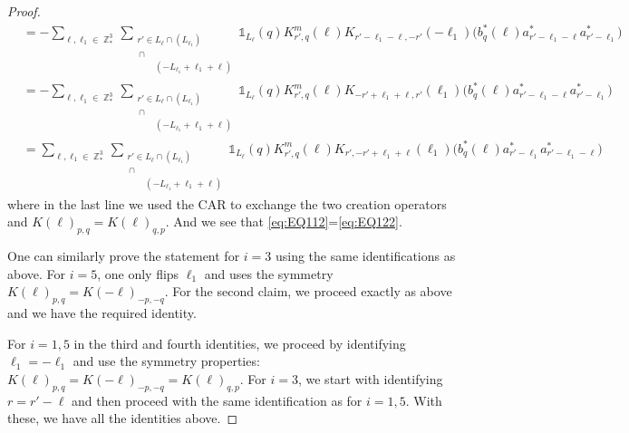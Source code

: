 \documentclass[sn-mathphys, Numbered ,a4paper]{sn-jnl}%
\DeclareMathOperator{\Z}{\mathbb{Z}}
\theoremstyle{plain}
\theoremstyle{definition}
\theoremstyle{remark}
\theoremstyle{plain}
\theoremstyle{definition}
\theoremstyle{remark}
\begin{document}
\begin{proof}
\begin{align}
		&=-\sum\limits_{\ell, \ell_1\in \Z^3_*}\sum\limits_{\substack{r' \in  L_{\ell} \cap (L_{\ell_1}) \\ \, \cap\\ \phantom{r'\in}  (-L_{\ell_1}+\ell_1+\ell)}} \!\!\!\! \mathds{1}_{L_\ell}(q) K^{m}_{r',q}(\ell) K_{r'-\ell_1-\ell,-r'}(-\ell_1)\Big( b^*_{q}(\ell) a^*_{r'-\ell_1-\ell}a^*_{r'-\ell_1}\Big)\nonumber\\
		&=-\sum\limits_{\ell, \ell_1\in \Z^3_*}\sum\limits_{\substack{r' \in  L_{\ell} \cap (L_{\ell_1}) \\ \, \cap\\ \phantom{r'\in}  (-L_{\ell_1}+\ell_1+\ell)}} \!\!\!\! \mathds{1}_{L_\ell}(q) K^{m}_{r',q}(\ell) K_{-r'+\ell_1+\ell,r'}(\ell_1)\Big( b^*_{q}(\ell) a^*_{r'-\ell_1-\ell}a^*_{r'-\ell_1}\Big)\nonumber\\
		&=\sum\limits_{\ell, \ell_1\in \Z^3_*}\sum\limits_{\substack{r' \in  L_{\ell} \cap (L_{\ell_1}) \\ \, \cap\\ \phantom{r'\in}  (-L_{\ell_1}+\ell_1+\ell)}} \!\!\!\! \mathds{1}_{L_\ell}(q) K^{m}_{r',q}(\ell) K_{r',-r'+\ell_1+\ell}(\ell_1)\Big( b^*_{q}(\ell) a^*_{r'-\ell_1} a^*_{r'-\ell_1-\ell}\Big)\label{eq:EQ122} 
	\end{align}
	where in the last line we used the CAR to exchange the two creation operators and $K(\ell)_{p,q}=K(\ell)_{q,p}$. And we see that \eqref{eq:EQ112}=\eqref{eq:EQ122}.
	
	One can similarly prove the statement for $i = 3$ using the same identifications as above. For $i = 5$, one only flips $\ell_1$ and uses the symmetry  $K(\ell)_{p,q} = K(-\ell)_{-p,-q}$. For the second claim, we proceed exactly as above and we have the required identity.
	
	For $i=1,5$ in the third and fourth identities, we proceed by identifying $\ell_1=-\ell_1$ and use the symmetry properties: $K(\ell)_{p,q} = K(-\ell)_{-p,-q}= K(\ell)_{q,p}$.  For $i=3$, we start with identifying $r=r'-\ell$ and then proceed with the same identification as for $i=1,5$. With these, we have all the identities above.
\end{proof}
\end{document}
